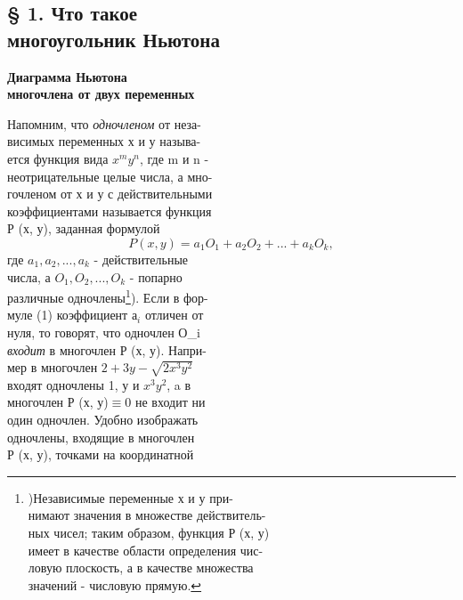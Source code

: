 \documentclass[12pt]{article}
\begin{document}
\begin{multicols}{2}
\begin{flushleft}
\section*{§ 1. Что такое\\ многоугольник Ньютона}
\textbf{Диаграмма Ньютона\\многочлена от двух переменных}

Напомним, что \textit{одночленом} от неза-\\ 
висимых переменных х и у называ-\\
ется функция вида $x^{m} y^{n}$, где m и n -\\
неотрицательные целые числа, а мно-\\
гочленом от х и у с действительными\\
коэффициентами называется функция\\
Р (х, у), заданная формулой
\begin{equation}
P (x, y) = a_{1}O_{1} + a_{2}O_{2} + ... + a_{k}O_{k},
\end{equation}
где $a_{1}, a_{2}, ..., a_{k}$ - действительные\\
числа, а $O_{1}, O_{2}, ..., O_{k}$ - попарно\\
различные одночлены\footnote{)Независимые переменные х и у при-\\
нимают значения в множестве действитель-\\
ных чисел; таким образом, функция Р (х, у)\\
имеет в качестве области определения чис-\\
ловую плоскость, а в качестве множества\\
значений - числовую прямую.}). Если в фор-\\
муле (1) коэффициент $а_{i}$ отличен от\\
нуля, то говорят, что одночлен О_{i}\\
\textit{входит} в многочлен Р (х, у). Напри-\\ 
мер в многочлен $2+3y-\sqrt{2x^{3}y^{2}}$\\
входят одночлены 1, у и $x^{3}y^{2}$, a в\\
многочлен Р (х, у)$\equiv0$ не входит ни\\
один одночлен. Удобно изображать\\
одночлены, входящие в многочлен\\
Р (х, у), точками на координатной\\

\end{flushleft}
\end{multicols}
\end{document}
